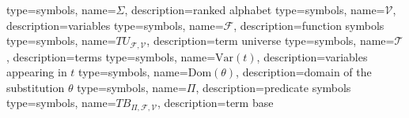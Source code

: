 
\makeglossary

{
    type=symbols,
    name={\ensuremath{\Sigma}},
    description={ranked alphabet}
}
{
    type=symbols,
    name={\ensuremath{\mathcal{V}}},
    description={variables}
}
{
    type=symbols,
    name={\ensuremath{\mathcal{F}}},
    description={function symbols}
}
{
    type=symbols,
    name={\ensuremath{TU_{\mathcal{F},\mathcal{V}}}},
    description={term universe}
}
{
    type=symbols,
    name={\ensuremath{\mathcal{T}}},
    description={terms}
}
{
    type=symbols,
    name={\ensuremath{\mathrm{Var}(t)}},
    description={variables appearing in \(t\)}
}
{
    type=symbols,
    name={\ensuremath{\mathrm{Dom}(\theta)}},
    description={domain of the substitution \(\theta\)}
}
{
    type=symbols,
    name={\ensuremath{\Pi}},
    description={predicate symbols}
}
{
    type=symbols,
    name={\ensuremath{TB_{\Pi,\mathcal{F},\mathcal{V}}}},
    description={term base}
}
